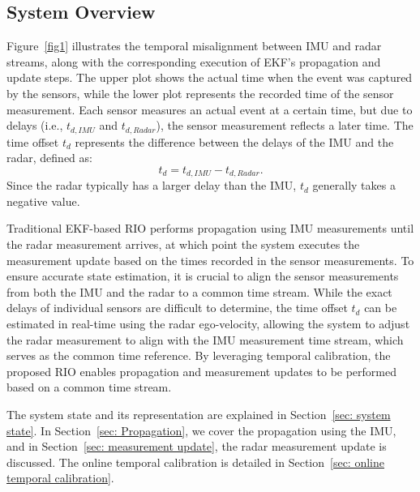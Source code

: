 \subsection{System Overview}
\label{sec: system overview}
Figure~\ref{fig1} illustrates the temporal misalignment between IMU and radar streams, along with the corresponding execution of EKF’s propagation and update steps. The upper plot shows the actual time when the event was captured by the sensors, while the lower plot represents the recorded time of the sensor measurement. Each sensor measures an actual event at a certain time, but due to delays (i.e., $t_{d,IMU}$ and $t_{d,Radar}$), the sensor measurement reflects a later time. The time offset $t_d$ represents the difference between the delays of the IMU and the radar, defined as:
\begin{equation}
\label{time_offset}
    t_d = t_{d,IMU} - t_{d,Radar}.
\end{equation}
Since the radar typically has a larger delay than the IMU, $t_d$ generally takes a negative value.

Traditional EKF-based RIO performs propagation using IMU measurements until the radar measurement arrives, at which point the system executes the measurement update based on the times recorded in the sensor measurements. To ensure accurate state estimation, it is crucial to align the sensor measurements from both the IMU and the radar to a common time stream. While the exact delays of individual sensors are difficult to determine, the time offset $t_d$ can be estimated in real-time using the radar ego-velocity, allowing the system to adjust the radar measurement to align with the IMU measurement time stream, which serves as the common time reference. By leveraging temporal calibration, the proposed RIO enables propagation and measurement updates to be performed based on a common time stream.

The system state and its representation are explained in Section~\ref{sec: system state}. In Section~\ref{sec: Propagation}, we cover the propagation using the IMU, and in Section~\ref{sec: measurement update}, the radar measurement update is discussed. The online temporal calibration is detailed in Section~\ref{sec: online temporal calibration}.